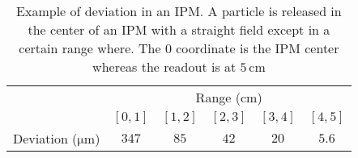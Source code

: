 \begin{table}[ht]
	\centering
	\caption[]
	{Example of deviation in an IPM. A particle is released in the center of an IPM with a straight field except in a certain range where. The 0 coordinate is the IPM center whereas the readout is at \(5 \, \mathrm{cm}\)}
	\label{chap3:Deviation}
	\begin{tabular}{cccccc}
		\toprule
		                               & \multicolumn{5}{c}{Range (\(\mathrm{cm}\))}                                                 \\
		\cmidrule(lr){2-6}
		                               & \([0,1]\)                                   & \([1,2]\) & \([2,3]\) & \([3,4]\) & \([4,5]\) \\
		\midrule
		Deviation (\(\mathrm{\mu m}\)) & \(347\)                                     & \(85\)    & \(42\)    & \(20\)    & \(5.6\)   \\
		\bottomrule
	\end{tabular}
\end{table}